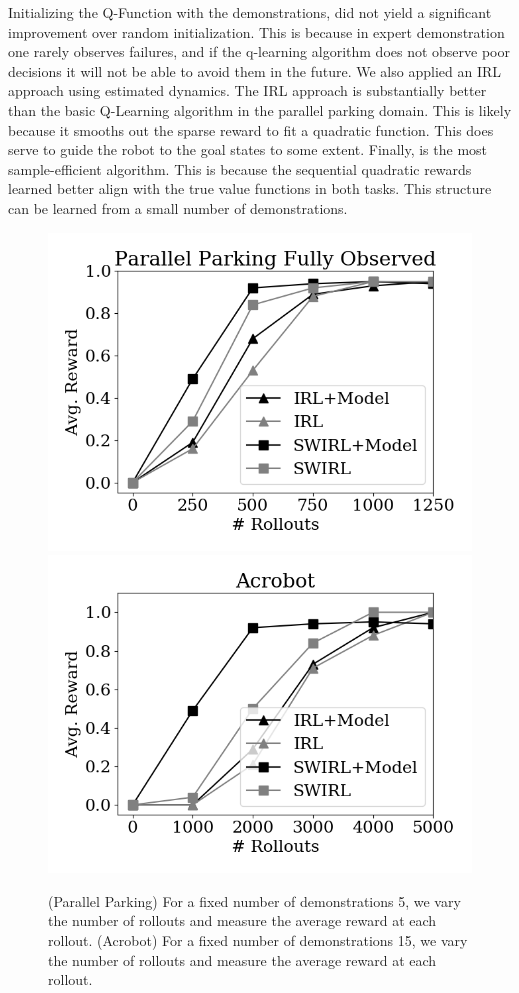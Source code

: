 Initializing the Q-Function with the demonstrations, did not yield a significant improvement over random initialization. This is because in expert demonstration one rarely observes failures, and if the q-learning algorithm does not observe poor decisions it will not be able to avoid them in the future. We also applied an IRL approach using estimated dynamics. The IRL approach is substantially better than the basic Q-Learning algorithm in the parallel parking domain. This is likely because it smooths out the sparse reward to fit a quadratic function. This does serve to guide the robot to the goal states to some extent. Finally, \hirl is the most sample-efficient algorithm. This is because the sequential quadratic rewards learned better align with the true value functions in both tasks. This structure can be learned from a small number of demonstrations.

\begin{figure}[t]
\centering
 \includegraphics[width=0.48\columnwidth]{swirl-experiments/ppfo-mod1.png}
 \includegraphics[width=0.48\columnwidth]{swirl-experiments/ppfo-mod2.png}
 \caption{(Parallel Parking) For a fixed number of demonstrations 5, we vary the number of rollouts and measure the average reward at each rollout.  (Acrobot) For a fixed number of demonstrations 15, we vary the number of rollouts and measure the average reward at each rollout. \label{exp:mod}}
\end{figure}

